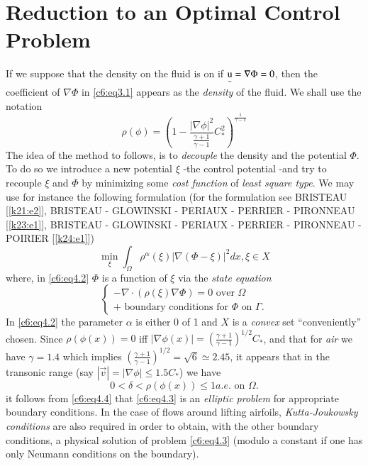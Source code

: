 \section{Reduction to an Optimal Control Problem}

If we suppose that the density on the fluid is on if $\operatorname*{u}\limits_\sim 
= \nabla \Phi = 0$, then the coefficient of $\nabla \Phi$ in 
\eqref{c6:eq3.1} appears as the \textit {density} of the fluid. We 
shall use the notation   
\begin{equation}
\rho (\phi ) = \left( 1 -\frac{|\nabla \phi |^2} {\frac{\gamma + 
1} {\gamma - 1}} C^2_*\right)^{\frac{1}{\gamma - 1}} 
\end{equation}
The idea of the method to follows, is to \textit {decouple} the density 
and the potential $\Phi$. To do so we introduce a new potential $\xi$ 
-the control potential -and try to recouple $\xi$ and $\Phi$ by 
minimizing some \textit {cost function} of \textit {least square type}. 
We may use for instance the following formulation (for the formulation 
see BRISTEAU [\ref{k21:e2}], BRISTEAU - GLOWINSKI - PERIAUX - PERRIER
- PIRONNEAU  
[\ref{k23:e1}], BRISTEAU - GLOWINSKI - PERIAUX - PERRIER - PIRONNEAU - POIRIER 
[\ref{k24:e1}])       
\begin{equation}
\min_\xi \int_\Omega \rho^\alpha (\xi ) | \nabla (\Phi -\xi )|^2 
dx , \xi \in X \tag{4.2}\label{c6:eq4.2} 
\end{equation}
where, in \eqref{c6:eq4.2} $\Phi$ is a function of $\xi$ via the 
\textit{state equation} 
\begin{equation}
\begin{cases}
- \nabla \cdot (\rho (\xi ) \nabla \Phi ) = 0 \text{ over 
} \Omega \\ 
+ \text{ boundary conditions for } \Phi \text{ on } \Gamma.  
\end{cases}
\tag{4.3}\label{c6:eq4.3}
\end{equation}\pageoriginale 
In \eqref{c6:eq4.2} the parameter $\alpha$ is either 0 of 1 and $X$ is 
a \textit{convex} set ``conveniently'' chosen. Since $\rho (\phi (x) ) 
= 0$ iff $|\nabla \phi (x) | = \left( \frac{\gamma + 1}{\gamma 
- 1} \right)^{1/2} C_*$, and that for \textit{air} we have $\gamma = 1. 
4$ which implies $\left( \frac{\gamma + 1}{\gamma -1}\right)^{1/2} = 
\sqrt{6} \simeq 2. 45$, it appears that in the transonic range (say $| 
\vec{v}| = | \nabla \phi | \leq 1. 5 C_* $) we have        
\begin{equation}
0 < \delta < \rho (\phi (x)) \leq 1 a.e. \text{ on } \Omega. 
\tag{4.4}\label{c6:eq4.4} 
\end{equation}
it follows from \eqref{c6:eq4.4} that \eqref{c6:eq4.3} is an 
\textit{elliptic problem} for appropriate boundary conditions. In the 
case of flows around lifting airfoils, \textit{Kutta-Joukowsky 
conditions} are also required in order to obtain, with the other 
boundary conditions, a physical solution  of problem \eqref{c6:eq4.3} 
(modulo a constant if one has only Neumann conditions on the boundary).  
     

